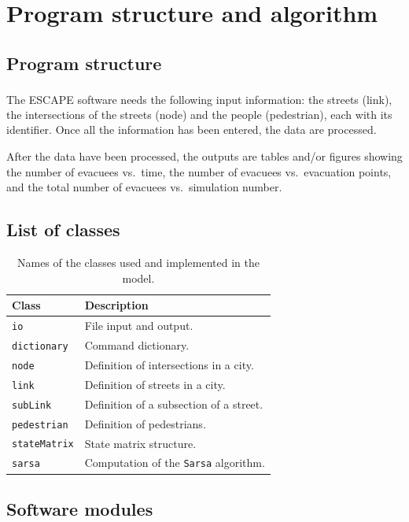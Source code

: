 \documentclass[12pt,a4paper]{book}
\newcommand{\escape}{ESCAPE\textsuperscript{\textregistered}}
\begin{document}
\chapter{Program structure and algorithm}

\section{Program structure}
The \escape{} software needs the following input information: the streets (link), the
intersections of the streets (node) and the people (pedestrian), each with its identifier. Once all
the information has been entered, the data are processed.

After the data have been processed, the outputs are tables and/or figures showing the number of
evacuees vs.\ time, the number of evacuees vs.\ evacuation points, and the total number of
evacuees vs.\ simulation number.

\section{List of classes}
\begin{table}[htbp]
  \centering
  \begin{tabular}{@{}ll@{}}
    \toprule
    Class & Description\\
    \midrule
    \texttt{io}          & File input and output.\\
    \texttt{dictionary}  & Command dictionary.\\
    \texttt{node}        & Definition of intersections in a city.\\
    \texttt{link}        & Definition of streets in a city.\\
    \texttt{subLink}     & Definition of a subsection of a street.\\
    \texttt{pedestrian}  & Definition of pedestrians.\\
    \texttt{stateMatrix} & State matrix structure.\\
    \texttt{sarsa}       & Computation of the \texttt{Sarsa} algorithm.\\
    \bottomrule
  \end{tabular}
  \caption{Names of the classes used and implemented in the model.}
\end{table}

\section{Software modules}
\end{document}
